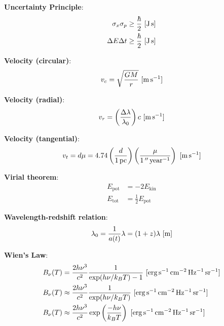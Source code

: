 \documentclass[a4paper,11pt]{article}
\begin{document}
{\noindent}\textbf{Uncertainty Principle}:
\begin{align*}
    \sigma_x\sigma_p \geq \frac{\hbar}{2} ~ [{\rm J\,s}] \\
    \Delta E \Delta t \geq \frac{\hbar}{2} ~ [{\rm J\,s}]
\end{align*}

{\noindent}\textbf{Velocity (circular)}:
\begin{align*}
    v_c = \sqrt{\frac{GM}{r}} ~ [{\rm m\,s^{-1}}]
\end{align*}

{\noindent}\textbf{Velocity (radial)}:
\begin{align*}
    v_r = \left(\frac{\Delta\lambda}{\lambda_0}\right)c ~ [{\rm m\,s^{-1}}]
\end{align*}

{\noindent}\textbf{Velocity (tangential)}:
\begin{align*}
    v_t = d\mu = 4.74\left(\frac{d}{1\,{\rm pc}}\right) \left(\frac{\mu}{1\,''\,{\rm year^{-1}}}\right) ~ [{\rm m\,s^{-1}}]
\end{align*}

{\noindent}\textbf{Virial theorem}:
\begin{align*}
    E_\mathrm{pot} &= -2E_\mathrm{kin} \\
    E_\mathrm{tot} &= \frac{1}{2}E_\mathrm{pot}
\end{align*}

{\noindent}\textbf{Wavelength-redshift relation}:
\begin{align*}
    \lambda_0 = \frac{1}{a(t)}\lambda = (1+z)\lambda ~ [{\rm m}]
\end{align*}

{\noindent}\textbf{Wien's Law}:
\begin{align*}
    B_\nu(T) &= \frac{2h\nu^3}{c^2} \frac{1}{\exp(h\nu/k_BT) - 1} ~ [{\rm erg\,s^{-1}\,cm^{-2}\,Hz^{-1}\,sr^{-1}}] \\
    B_\nu(T) &\approx \frac{2h\nu^3}{c^2} \frac{1}{\exp(h\nu/k_BT)} ~ [{\rm erg\,s^{-1}\,cm^{-2}\,Hz^{-1}\,sr^{-1}}] \\
    B_\nu(T) &\approx \frac{2h\nu^3}{c^2} \exp\left(\frac{-h\nu}{k_BT}\right) ~ [{\rm erg\,s^{-1}\,cm^{-2}\,Hz^{-1}\,sr^{-1}}]
\end{align*}
\end{document}
